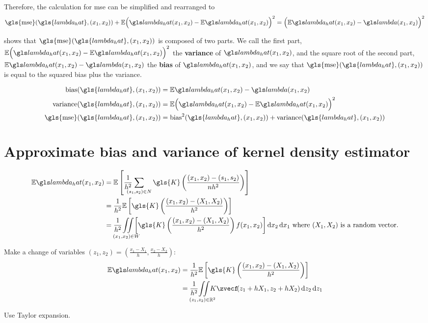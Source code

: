 Therefore, the calculation for \gls{mse} can be simplified and rearranged to 
\begin{equation}
    \label{eq:mse:biasvariance}
    \mbox{\gls{mse}}(\gls{lambda_hat}, \xvec)
        + \E \Big( \lmbdhat - \E\lmbdhat \Big)^2
        = \Big( \E\lmbdhat - \lmbd \Big)^2 
\end{equation}

 shows that $\mbox{\gls{mse}}(\gls{lambda_hat}, \xvec)$
is composed of two parts.
We call the first part, $\E \Big( \lmbdhat - \E\lmbdhat \Big)^2$ the \textbf{variance} of $\lmbdhat$,
and the square root of the second part, $\E\lmbdhat - \lmbd$ the \textbf{bias} of $\lmbdhat$,
and we say that $\mbox{\gls{mse}}(\gls{lambda_hat}, \xvec)$ is equal to the squared bias plus the variance.

\begin{align}
    \mbox{bias}(\gls{lambda_hat}, \xvec) & = \E\lmbdhat - \lmbd \label{eq:estimator:bias} \\
    \mbox{variance}(\gls{lambda_hat}, \xvec) & = \E \Big( \lmbdhat - \E\lmbdhat \Big)^2 \label{eq:estimator:variance} \\
    \mbox{\gls{mse}}(\gls{lambda_hat}, \xvec) & = \mbox{bias}^2 (\gls{lambda_hat}, \xvec) + \mbox{variance} (\gls{lambda_hat}, \xvec) \label{eq:estimator:mse} 
\end{align}

\section{Approximate bias and variance of kernel density estimator}
\label{sec:derivations:biasvariancekernel}

\begin{align}
    \E \lmbdhat
        &= \E \left[ \sumS{\gls{K}\left(\frac{\xvec-(s_1, s_2)}{n h^2}\right)} \right] \nonumber \\%
        &= \frac{1}{h^2} \E%
                \left[%
                    \gls{K}\left(\frac{\xvec-(X_1, X_2)}{h^2}\right)%
                \right] \nonumber \\%
        &= \frac{1}{h^2} \iintW{%
                \left[%
                    \gls{K}\left(\frac{\xvec-(X_1, X_2)}{h^2}\right)f(x_1, x_2)%
                \right]}%
            ~\text{where}~(X_1,X_2)~\text{is a random vector.} \nonumber%
\end{align}

Make a change of variables
$(z_1, z_2) = \left( \frac{x_1-X_1}{h},\frac{x_2-X_2}{h} \right)$:
\begin{align}
    \E \lmbdhat%
        &= \frac{1}{h^2} \E%
                \left[%
                    \gls{K}\left(\frac{\xvec-(X_1, X_2)}{h^2}\right)%
                \right] \\%
        &= \frac{1}{h^2} \iintRZ{%
            K \zvec%
            f\!\!\left(z_1 + h X_1, z_2 + h X_2\right)%
        }%
\end{align}

Use Taylor expansion.


